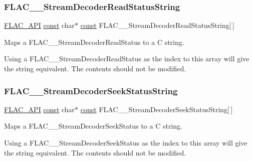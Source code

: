 \subsubsection{\texorpdfstring{F\+L\+A\+C\+\_\+\+\_\+\+Stream\+Decoder\+Read\+Status\+String}{FLAC\_\_StreamDecoderReadStatusString}}
{\footnotesize\ttfamily \hyperlink{group__flac__export_ga56ca07df8a23310707732b1c0007d6f5}{F\+L\+A\+C\+\_\+\+A\+PI} \hyperlink{zconf_8h_a2c212835823e3c54a8ab6d95c652660e}{const} char$\ast$ \hyperlink{zconf_8h_a2c212835823e3c54a8ab6d95c652660e}{const} F\+L\+A\+C\+\_\+\+\_\+\+Stream\+Decoder\+Read\+Status\+String\mbox{[}$\,$\mbox{]}}

Maps a F\+L\+A\+C\+\_\+\+\_\+\+Stream\+Decoder\+Read\+Status to a C string.

Using a F\+L\+A\+C\+\_\+\+\_\+\+Stream\+Decoder\+Read\+Status as the index to this array will give the string equivalent. The contents should not be modified. \mbox{\label{group__flac__stream__decoder_gac793d777a3d5a63e735415b9bea5b20a}} 
\subsubsection{\texorpdfstring{F\+L\+A\+C\+\_\+\+\_\+\+Stream\+Decoder\+Seek\+Status\+String}{FLAC\_\_StreamDecoderSeekStatusString}}
{\footnotesize\ttfamily \hyperlink{group__flac__export_ga56ca07df8a23310707732b1c0007d6f5}{F\+L\+A\+C\+\_\+\+A\+PI} \hyperlink{zconf_8h_a2c212835823e3c54a8ab6d95c652660e}{const} char$\ast$ \hyperlink{zconf_8h_a2c212835823e3c54a8ab6d95c652660e}{const} F\+L\+A\+C\+\_\+\+\_\+\+Stream\+Decoder\+Seek\+Status\+String\mbox{[}$\,$\mbox{]}}

Maps a F\+L\+A\+C\+\_\+\+\_\+\+Stream\+Decoder\+Seek\+Status to a C string.

Using a F\+L\+A\+C\+\_\+\+\_\+\+Stream\+Decoder\+Seek\+Status as the index to this array will give the string equivalent. The contents should not be modified. \mbox{\label{group__flac__stream__decoder_gae1c6a6fb59fce39e251233fa221fe61d}} 
